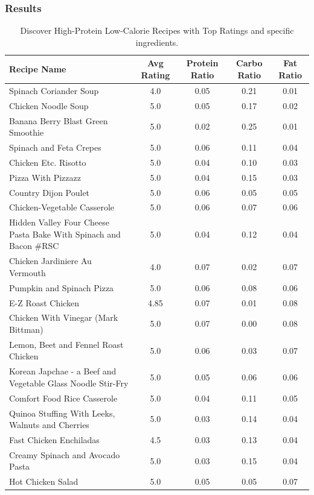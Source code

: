 \begin{enumerate}
    \subsubsection{Results}
    \begin{table}[h!]
\small %
\centering
\begin{tabularx}{\textwidth}{>{\raggedright\arraybackslash}Xcccc}
\toprule
\textbf{Recipe Name} & \textbf{Avg Rating} & \textbf{Protein Ratio} & \textbf{Carbo Ratio} & \textbf{Fat Ratio} \\
\midrule
Spinach Coriander Soup                            & 4.0  & 0.05 & 0.21 & 0.01 \\
Chicken Noodle Soup                               & 5.0  & 0.05 & 0.17 & 0.02 \\
Banana Berry Blast Green Smoothie                & 5.0  & 0.02 & 0.25 & 0.01 \\
Spinach and Feta Crepes                           & 5.0  & 0.06 & 0.11 & 0.04 \\
Chicken Etc. Risotto                              & 5.0  & 0.04 & 0.10 & 0.03 \\
Pizza With Pizzazz                                & 5.0  & 0.04 & 0.15 & 0.03 \\
Country Dijon Poulet                              & 5.0  & 0.06 & 0.05 & 0.05 \\
Chicken-Vegetable Casserole                       & 5.0  & 0.06 & 0.07 & 0.06 \\
Hidden Valley Four Cheese Pasta Bake With Spinach and Bacon \#RSC & 5.0  & 0.04 & 0.12 & 0.04 \\
Chicken Jardiniere Au Vermouth                   & 4.0  & 0.07 & 0.02 & 0.07 \\
Pumpkin and Spinach Pizza                         & 5.0  & 0.06 & 0.08 & 0.06 \\
E-Z Roast Chicken                                & 4.85 & 0.07 & 0.01 & 0.08 \\
Chicken With Vinegar (Mark Bittman)              & 5.0  & 0.07 & 0.00 & 0.08 \\
Lemon, Beet and Fennel Roast Chicken             & 5.0  & 0.06 & 0.03 & 0.07 \\
Korean Japchae - a Beef and Vegetable Glass Noodle Stir-Fry & 5.0  & 0.05 & 0.06 & 0.06 \\
Comfort Food Rice Casserole                       & 5.0  & 0.04 & 0.11 & 0.05 \\
Quinoa Stuffing With Leeks, Walnuts and Cherries & 5.0  & 0.03 & 0.14 & 0.04 \\
Fast Chicken Enchiladas                           & 4.5  & 0.03 & 0.13 & 0.04 \\
Creamy Spinach and Avocado Pasta                 & 5.0  & 0.03 & 0.15 & 0.04 \\
Hot Chicken Salad                                & 5.0  & 0.05 & 0.05 & 0.07 \\
\bottomrule
\end{tabularx}
\caption{Discover High-Protein Low-Calorie Recipes with Top Ratings and specific ingredients.}
\label{tab:recipe_data}
\end{table}

\end{enumerate}
\clearpage
